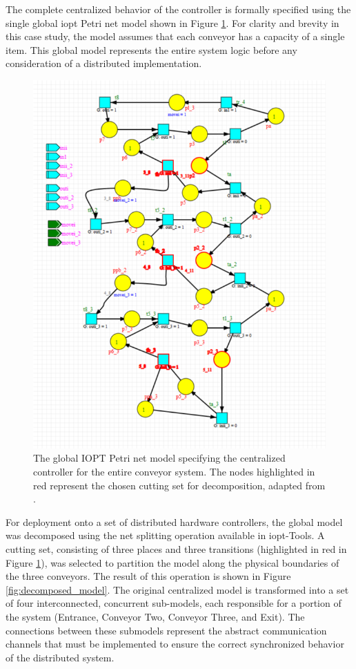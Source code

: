 The complete centralized behavior of the controller is formally specified using the single global \gls{iopt} Petri net model shown in Figure \ref{fig:global_model}. For clarity and brevity in this case study, the model assumes that each conveyor has a capacity of a single item. This global model represents the entire system logic before any consideration of a distributed implementation.

\begin{figure}[htb]
    \centering
    \includegraphics[width=0.95\columnwidth]{Chapters/Figures/modeloglobalcomcuttingset.png}
    \caption{The global IOPT Petri net model specifying the centralized controller for the entire conveyor system. The nodes highlighted in red represent the chosen cutting set for decomposition, adapted from \cite{tavaresgomes2026}.}
    \label{fig:global_model}
\end{figure}

For deployment onto a set of distributed hardware controllers, the global model was decomposed using the net splitting operation available in \gls{iopt}-Tools. A cutting set, consisting of three places and three transitions (highlighted in red in Figure \ref{fig:global_model}), was selected to partition the model along the physical boundaries of the three conveyors. The result of this operation is shown in Figure \ref{fig:decomposed_model}. The original centralized model is transformed into a set of four interconnected, concurrent sub-models, each responsible for a portion of the system (Entrance, Conveyor Two, Conveyor Three, and Exit). The connections between these submodels represent the abstract communication channels that must be implemented to ensure the correct synchronized behavior of the distributed system.

